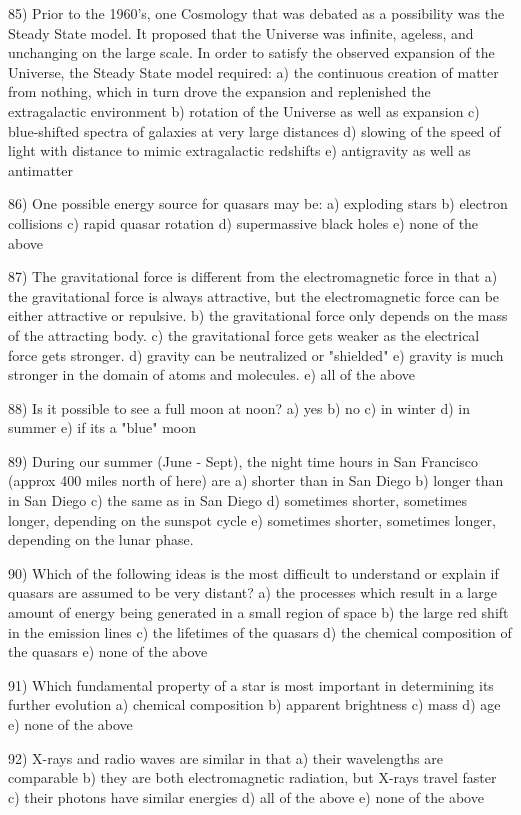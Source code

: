 85) Prior to the 1960's, one Cosmology that was debated as a possibility was
the Steady State model. It proposed that the Universe was infinite,
ageless, and unchanging on the large scale. In order to satisfy the
observed expansion of the Universe, the Steady State model required:
a) the continuous creation of matter from nothing, which in turn drove the
expansion and replenished the extragalactic environment
b) rotation of the Universe as well as expansion
c) blue-shifted spectra of galaxies at very large distances
d) slowing of the speed of light with distance to mimic extragalactic
redshifts
e) antigravity as well as antimatter

86) One possible energy source for quasars may be:
a) exploding stars b) electron collisions
c) rapid quasar rotation d) supermassive black holes
e) none of the above

87) The gravitational force is different from the electromagnetic force in that
a) the gravitational force is always attractive, but the electromagnetic
force can be either attractive or repulsive.
b) the gravitational force only depends on the mass of the attracting body.
c) the gravitational force gets weaker as the electrical force gets stronger.
d) gravity can be neutralized or "shielded"
e) gravity is much stronger in the domain of atoms and molecules.
e) all of the above

88) Is it possible to see a full moon at noon?
a) yes b) no c) in winter d) in summer e) if its a "blue" moon

89) During our summer (June - Sept), the night time hours in San Francisco
(approx 400 miles north of here) are
a) shorter than in San Diego
b) longer than in San Diego
c) the same as in San Diego
d) sometimes shorter, sometimes longer, depending on the sunspot cycle
e) sometimes shorter, sometimes longer, depending on the lunar phase.

90) Which of the following ideas is the most difficult to understand or explain
if quasars are assumed to be very distant?
a) the processes which result in a large amount of energy being generated
in a small region of space
b) the large red shift in the emission lines
c) the lifetimes of the quasars
d) the chemical composition of the quasars
e) none of the above

91) Which fundamental property of a star is most important in determining
its further evolution
a) chemical composition b) apparent brightness
c) mass d) age e) none of the above

92) X-rays and radio waves are similar in that
a) their wavelengths are comparable
b) they are both electromagnetic radiation, but X-rays travel faster
c) their photons have similar energies
d) all of the above
e) none of the above

